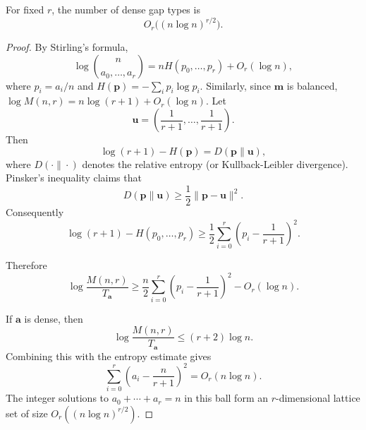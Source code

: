 \documentclass[10pt,a4paper]{amsart}
\begin{document}
\begin{lemma}\label{lem:dense-general}
For fixed $r$, the number of dense gap types is
\[
   O_r\bigl((n\log n)^{r/2}\bigr).
\]
\end{lemma}

\begin{proof}
By Stirling's formula,
\[
   \log\binom{n}{a_0,
\ldots,a_r}=nH(p_0,
\ldots,p_r)+O_r(\log n),
\]
where $p_i=a_i/n$ and $H(\textbf{p})=-\sum_i p_i\log p_i$. Similarly, since \(\mathbf m\) is balanced,
$\log M(n,r)=n\log(r+1)+O_r(\log n).$
Let
\[
   \textbf{u}=\left(\frac1{r+1},\ldots,\frac1{r+1}\right).
\]
Then
\[
   \log(r+1)-H(\textbf{p})
   =
   D(\textbf{p}\|\textbf{u}),
\]
where \(D(\cdot\|\cdot)\) denotes the relative entropy (or Kullback-Leibler divergence). Pinsker's inequality claims  that \[
   D(\textbf{p}\|\textbf{u})
   \ge \frac12\|\textbf{p}-\textbf{u}\|^2.
\]
Consequently
\[
   \log(r+1)-H(p_0,\ldots,p_r)
   \ge
   \frac12\sum_{i=0}^r
   \left(p_i-\frac1{r+1}\right)^2 .
\]

Therefore
\[
   \log\frac{M(n,r)}{T_{\mathbf a}}
   \ge
   \frac n2\sum_{i=0}^r
   \left(p_i-\frac1{r+1}\right)^2
   -O_r(\log n).
\]

If $\mathbf a$ is dense, then
\[
   \log\frac{M(n,r)}{T_{\mathbf a}}
   \le (r+2)\log n.
\]
Combining this with the entropy estimate gives
\[
   \sum_{i=0}^r\left(a_i-\frac{n}{r+1}\right)^2
   =O_r(n\log n).
\]
The integer solutions to $a_0+\cdots+a_r=n$ in this ball form an $r$-dimensional lattice set of size $O_r((n\log n)^{r/2})$.
\end{proof}
\end{document}

